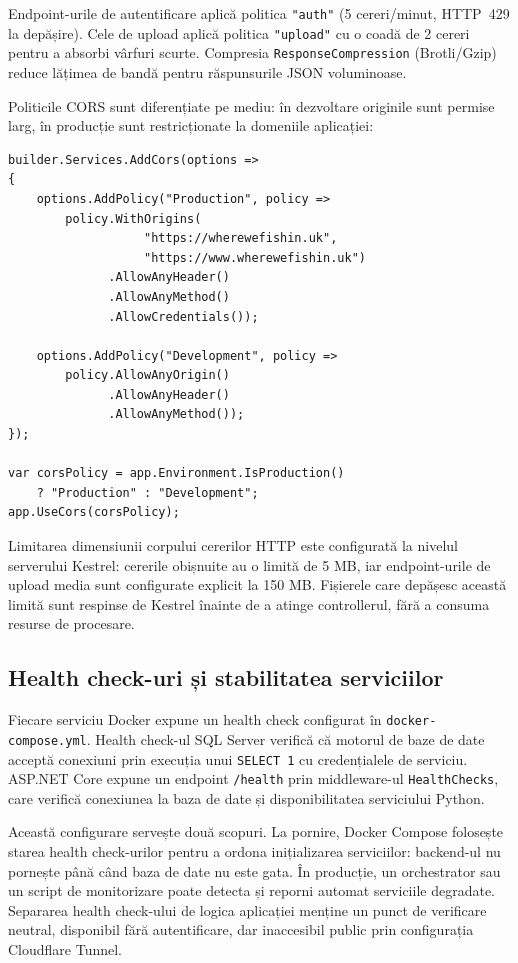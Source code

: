 Endpoint-urile de autentificare aplică politica \texttt{"auth"} (5 cereri/minut, HTTP~429 la depășire). Cele de upload aplică politica \texttt{"upload"} cu o coadă de 2 cereri pentru a absorbi vârfuri scurte. Compresia \texttt{ResponseCompression} (Brotli/Gzip) reduce lățimea de bandă pentru răspunsurile JSON voluminoase.

Politicile CORS sunt diferențiate pe mediu: în dezvoltare originile sunt permise larg, în producție sunt restricționate la domeniile aplicației:

\begin{lstlisting}[language={[Sharp]C}, caption={Politica CORS diferențiată pe mediu de execuție}]
builder.Services.AddCors(options =>
{
    options.AddPolicy("Production", policy =>
        policy.WithOrigins(
                   "https://wherewefishin.uk",
                   "https://www.wherewefishin.uk")
              .AllowAnyHeader()
              .AllowAnyMethod()
              .AllowCredentials());

    options.AddPolicy("Development", policy =>
        policy.AllowAnyOrigin()
              .AllowAnyHeader()
              .AllowAnyMethod());
});

var corsPolicy = app.Environment.IsProduction()
    ? "Production" : "Development";
app.UseCors(corsPolicy);
\end{lstlisting}

Limitarea dimensiunii corpului cererilor HTTP este configurată la nivelul serverului Kestrel: cererile obișnuite au o limită de 5 MB, iar endpoint-urile de upload media sunt configurate explicit la 150 MB. Fișierele care depășesc această limită sunt respinse de Kestrel înainte de a atinge controllerul, fără a consuma resurse de procesare.

\subsection{Health check-uri și stabilitatea serviciilor}

Fiecare serviciu Docker expune un health check configurat în \texttt{docker-compose.yml}. Health check-ul SQL Server verifică că motorul de baze de date acceptă conexiuni prin execuția unui \texttt{SELECT 1} cu credențialele de serviciu. ASP.NET Core expune un endpoint \texttt{/health} prin middleware-ul \texttt{HealthChecks}, care verifică conexiunea la baza de date și disponibilitatea serviciului Python.

Această configurare servește două scopuri. La pornire, Docker Compose folosește starea health check-urilor pentru a ordona inițializarea serviciilor: backend-ul nu pornește până când baza de date nu este gata. În producție, un orchestrator sau un script de monitorizare poate detecta și reporni automat serviciile degradate. Separarea health check-ului de logica aplicației menține un punct de verificare neutral, disponibil fără autentificare, dar inaccesibil public prin configurația Cloudflare Tunnel.

